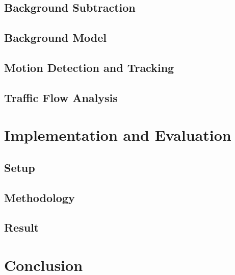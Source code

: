 \documentclass[conference]{IEEEtran}
\begin{document}
	\subsection{Background Subtraction}
	
	\subsection{Background Model}
	\subsection{Motion Detection and Tracking}
	\subsection{Traffic Flow Analysis}
	
	
	
\section{Implementation and Evaluation}
	\subsection{Setup}
	\subsection{Methodology}
	\subsection{Result}



\section{Conclusion}
\end{document}
